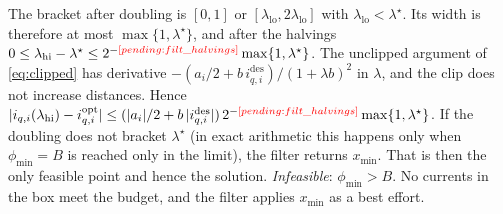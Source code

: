 The bracket after doubling is $[0,1]$ or $[\lambda_{\mathrm{lo}},2\lambda_{\mathrm{lo}}]$ with $\lambda_{\mathrm{lo}}<\lambda^\star$. Its width is therefore at most $\max\{1,\lambda^\star\}$, and after the halvings $0\le\lambda_{\mathrm{hi}}-\lambda^\star\le 2^{-\res{filt_halvings}}\max\{1,\lambda^\star\}$.
The unclipped argument of \eqref{eq:clipped} has derivative $-(a_i/2 + b\,i^{\mathrm{des}}_{q,i})/(1+\lambda b)^2$ in $\lambda$, and the clip does not increase distances. Hence $|i_{q,i}(\lambda_{\mathrm{hi}})-i^{\mathrm{opt}}_{q,i}| \le (|a_i|/2+b\,|i^{\mathrm{des}}_{q,i}|)\,2^{-\res{filt_halvings}}\max\{1,\lambda^\star\}$.
If the doubling does not bracket $\lambda^\star$ (in exact arithmetic this happens only when $\phi_{\min}=B$ is reached only in the limit), the filter returns $x_{\min}$. That is then the only feasible point and hence the solution.
\emph{Infeasible}: $\phi_{\min}>B$. No currents in the box meet the budget, and the filter applies $x_{\min}$ as a best effort.

